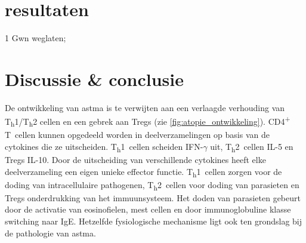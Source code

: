 \documentclass[abstract=true]{scrartcl}
\begin{document}
\section{resultaten}
\begin{table}
   \centering
   \begin{threeparttable}
\begin{tablenotes}
\item[1]Gwn weglaten;
\end{tablenotes}
\end{threeparttable}
\label{tab:overzicht_artcls}
\end{table}

\section{Discussie \& conclusie}

De ontwikkeling van astma is te verwijten aan een verlaagde verhouding van T\textsubscript{h}1/T\textsubscript{h}2 cellen en een gebrek aan Tregs (zie \cref{fig:atopie_ontwikkeling}). CD4\textsuperscript{+} T~cellen kunnen opgedeeld worden in deelverzamelingen op basis van de cytokines die ze uitscheiden. T\textsubscript{h}1~cellen scheiden IFN-$\gamma$ uit, T\textsubscript{h}2~cellen IL-5 en Tregs IL-10. Door de uitscheiding van verschillende cytokines heeft elke deelverzameling een eigen unieke effector functie. T\textsubscript{h}1~cellen zorgen voor de doding van intracellulaire pathogenen, T\textsubscript{h}2~cellen voor doding van parasieten en Tregs onderdrukking van het immuunsysteem. Het doden van parasieten gebeurt door de activatie van eosinofielen, mest cellen en door immunoglobuline klasse switching naar IgE. Hetzelfde fysiologische mechanisme ligt ook ten grondslag bij de pathologie van astma.
\end{document}
